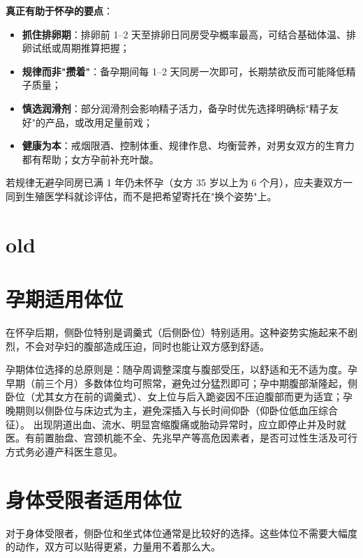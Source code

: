 \documentclass[12pt,UTF8]{ctexbook}
\begin{document}
\noindent\textbf{真正有助于怀孕的要点}：
\begin{itemize}
	\item \textbf{抓住排卵期}：排卵前 1--2 天至排卵日同房受孕概率最高，可结合基础体温、排卵试纸或周期推算把握；
	\item \textbf{规律而非"攒着"}：备孕期间每 1--2 天同房一次即可，长期禁欲反而可能降低精子质量；
	\item \textbf{慎选润滑剂}：部分润滑剂会影响精子活力，备孕时优先选择明确标"精子友好"的产品，或改用足量前戏；
	\item \textbf{健康为本}：戒烟限酒、控制体重、规律作息、均衡营养，对男女双方的生育力都有帮助；女方孕前补充叶酸。
\end{itemize}

\begin{tcolorbox}[colback=pink!5!white,colframe=red!50!black,title=贴心小叮咛]
	若规律无避孕同房已满 1 年仍未怀孕（女方 35 岁以上为 6 个月），应夫妻双方一同到生殖医学科就诊评估，而不是把希望寄托在"换个姿势"上。
\end{tcolorbox}

\section{old}
\vspace{0.5em}
\section{孕期适用体位}

在怀孕后期，侧卧位特别是调羹式（后侧卧位）特别适用。这种姿势实施起来不剧烈，不会对孕妇的腹部造成压迫，同时也能让双方感到舒适。

\vspace{0.5em}

孕期体位选择的总原则是：随孕周调整深度与腹部受压，以舒适和无不适为度。孕早期（前三个月）多数体位均可照常，避免过分猛烈即可；孕中期腹部渐隆起，侧卧位（尤其女方在前的调羹式）、女上位与后入跪姿因不压迫腹部而更为适宜；孕晚期则以侧卧位与床边式为主，避免深插入与长时间仰卧（仰卧位低血压综合征）。
出现阴道出血、流水、明显宫缩腹痛或胎动异常时，应立即停止并及时就医。有前置胎盘、宫颈机能不全、先兆早产等高危因素者，是否可过性生活及可行方式务必遵产科医生意见。

\section{身体受限者适用体位}

对于身体受限者，侧卧位和坐式体位通常是比较好的选择。这些体位不需要大幅度的动作，双方可以贴得更紧，力量用不着那么大。
\end{document}

